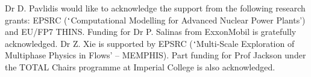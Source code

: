 \documentclass[preprint,authoryear,12pt]{elsarticle}
\begin{document}
\ack Dr D. Pavlidis would like to acknowledge the support from the
following research grants: EPSRC ($\lq$Computational Modelling for
Advanced Nuclear Power Plants') and EU/FP7 THINS. Funding for Dr
P. Salinas from ExxonMobil is gratefully acknowledged. Dr Z. Xie is
supported by EPSRC ($\lq$Multi-Scale Exploration of Multiphase Physics
in Flows' -- MEMPHIS). Part funding for Prof Jackson under the TOTAL
Chairs programme at Imperial College is also acknowledged.






\end{document}
